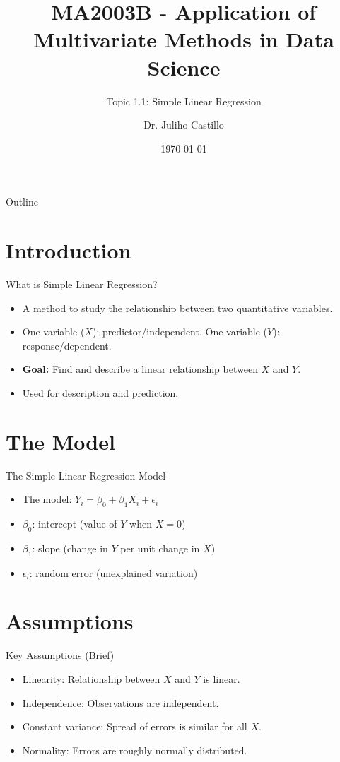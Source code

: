 \documentclass[aspectratio=169]{beamer}
\title[Simple Linear Regression]{MA2003B - Application of Multivariate Methods in Data Science}
\subtitle{Topic 1.1: Simple Linear Regression}
\author{Dr. Juliho Castillo}
\institute{Tec de Monterrey}
\date{\today}
\begin{document}
\begin{frame}
  \titlepage
\end{frame}

\begin{frame}{Outline}
  \tableofcontents
\end{frame}

\section{Introduction}
\begin{frame}{What is Simple Linear Regression?}
  \begin{itemize}
    \item A method to study the relationship between two quantitative variables.
    \item One variable ($X$): predictor/independent. One variable ($Y$): response/dependent.
    \item \textbf{Goal:} Find and describe a linear relationship between $X$ and $Y$.
    \item Used for description and prediction.
  \end{itemize}
\end{frame}

\section{The Model}
\begin{frame}{The Simple Linear Regression Model}
  \begin{itemize}
    \item The model: $Y_i = \beta_0 + \beta_1 X_i + \epsilon_i$
    \item $\beta_0$: intercept (value of $Y$ when $X=0$)
    \item $\beta_1$: slope (change in $Y$ per unit change in $X$)
    \item $\epsilon_i$: random error (unexplained variation)
  \end{itemize}
\end{frame}

\section{Assumptions}
\begin{frame}{Key Assumptions (Brief)}
  \begin{itemize}
    \item Linearity: Relationship between $X$ and $Y$ is linear.
    \item Independence: Observations are independent.
    \item Constant variance: Spread of errors is similar for all $X$.
    \item Normality: Errors are roughly normally distributed.
  \end{itemize}
\end{frame}
\end{document}
